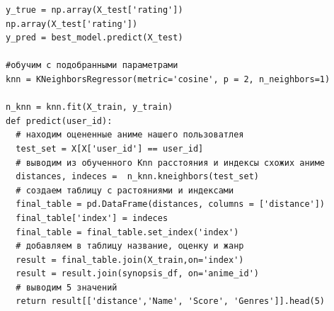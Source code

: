 \documentclass[bachelor, och, diploma]{SCWorks}
\begin{document}
\begin{verbatim}
y_true = np.array(X_test['rating'])
np.array(X_test['rating'])
y_pred = best_model.predict(X_test)

#обучим с подобранными параметрами
knn = KNeighborsRegressor(metric='cosine', p = 2, n_neighbors=1)

n_knn = knn.fit(X_train, y_train)
def predict(user_id):
  # находим оцененные аниме нашего пользоватлея
  test_set = X[X['user_id'] == user_id]
  # выводим из обученного Knn расстояния и индексы схожих аниме
  distances, indeces =  n_knn.kneighbors(test_set)
  # создаем таблицу с растояниями и индексами
  final_table = pd.DataFrame(distances, columns = ['distance'])
  final_table['index'] = indeces
  final_table = final_table.set_index('index')
  # добавляем в таблицу название, оценку и жанр
  result = final_table.join(X_train,on='index')
  result = result.join(synopsis_df, on='anime_id')
  # выводим 5 значений
  return result[['distance','Name', 'Score', 'Genres']].head(5)
\end{verbatim}
\end{document}
